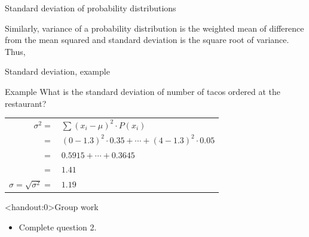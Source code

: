 \documentclass[xcolor=table, aspectratio=169, bigger]{beamer}
\begin{document}
\begin{frame}{Standard deviation of probability distributions}
\begin{block}{}
Similarly, variance of a probability distribution is the weighted mean of difference from the mean squared and standard deviation is the square root of variance.\\
\medskip
Thus, \\ \smallskip
{}
\end{block}
\end{frame}

\begin{frame}{Standard deviation, example}
\begin{exampleblock}{Example}
What is the standard deviation of number of tacos ordered at the restaurant?\\
\medskip
\pause
{\centering
\begin{tabular}{r l}
$\sigma^2 =$ & $\sum (x_i - \mu )^2 \cdot P(x_i)$\\
$=$ & $(0-1.3)^2 \cdot 0.35 + \cdots + (4-1.3)^2 \cdot 0.05$\\
$=$ & $0.5915 + \cdots + 0.3645$\\
$=$ & $1.41$\\
\pause$\sigma = \sqrt{\sigma^2} = $ & $1.19$
\end{tabular}\par
\renewcommand{\arraystretch}{1.5}}
\end{exampleblock}
\end{frame}


\begin{frame}<handout:0>{Group work}
\begin{block}{}
\large
\begin{itemize}
\item Complete question 2.
\end{itemize}
\end{block}
\end{frame}
\end{document}
